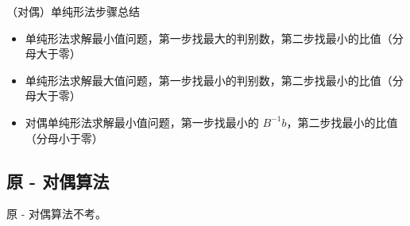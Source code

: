 \begin{note}
    （对偶）单纯形法步骤总结
    \begin{itemize}
        \item 单纯形法求解最小值问题，第一步找最大的判别数，第二步找最小的比值（分母大于零）
        \item 单纯形法求解最大值问题，第一步找最小的判别数，第二步找最小的比值（分母大于零）
        \item 对偶单纯形法求解最小值问题，第一步找最小的 $B^{-1}b$，第二步找最小的比值（分母小于零）
    \end{itemize}    
\end{note}

\subsection{原 - 对偶算法}
原 - 对偶算法不考。
